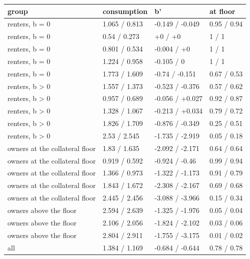 \begingroup\small
\setlength{\tabcolsep}{3pt}
\renewcommand{\arraystretch}{1.04}
\begin{tabularx}{\linewidth}{XXXX}
\toprule
group & consumption & b' & at floor \\
\midrule
renters, b = 0 & 1.065 / 0.813 & -0.149 / -0.049 & 0.95 / 0.94 \\
renters, b = 0 & 0.54 / 0.273 & +0 / +0 & 1 / 1 \\
renters, b = 0 & 0.801 / 0.534 & -0.004 / +0 & 1 / 1 \\
renters, b = 0 & 1.224 / 0.958 & -0.105 / 0 & 1 / 1 \\
renters, b = 0 & 1.773 / 1.609 & -0.74 / -0.151 & 0.67 / 0.53 \\
renters, b \textgreater{} 0 & 1.557 / 1.373 & -0.523 / -0.376 & 0.57 / 0.62 \\
renters, b \textgreater{} 0 & 0.957 / 0.689 & -0.056 / +0.027 & 0.92 / 0.87 \\
renters, b \textgreater{} 0 & 1.328 / 1.067 & -0.213 / +0.034 & 0.79 / 0.72 \\
renters, b \textgreater{} 0 & 1.826 / 1.709 & -0.876 / -0.349 & 0.25 / 0.51 \\
renters, b \textgreater{} 0 & 2.53 / 2.545 & -1.735 / -2.919 & 0.05 / 0.18 \\
owners at the collateral floor & 1.83 / 1.635 & -2.092 / -2.171 & 0.64 / 0.64 \\
owners at the collateral floor & 0.919 / 0.592 & -0.924 / -0.46 & 0.99 / 0.94 \\
owners at the collateral floor & 1.366 / 0.973 & -1.322 / -1.173 & 0.91 / 0.79 \\
owners at the collateral floor & 1.843 / 1.672 & -2.308 / -2.167 & 0.69 / 0.68 \\
owners at the collateral floor & 2.445 / 2.456 & -3.088 / -3.966 & 0.15 / 0.34 \\
owners above the floor & 2.594 / 2.639 & -1.325 / -1.976 & 0.05 / 0.04 \\
owners above the floor & 2.106 / 2.056 & -1.824 / -2.102 & 0.03 / 0.06 \\
owners above the floor & 2.804 / 2.911 & -1.755 / -3.175 & 0.01 / 0.02 \\
all & 1.384 / 1.169 & -0.684 / -0.644 & 0.78 / 0.78 \\
\bottomrule
\end{tabularx}
\endgroup
